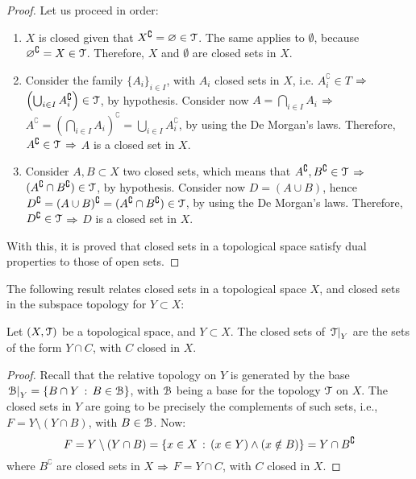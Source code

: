 \begin{proof}
	Let us proceed in order:
	\begin{enumerate}
		\item $X$ is closed given that $X^\complement=\varnothing\in \EuScript{T}$. The same applies to $\emptyset$, because $\varnothing^\complement=X\in \EuScript{T}$.
		Therefore, $X$ and $\emptyset$ are closed sets in $X$.
		\item Consider the family $\{A_i\}_{i\in I}$, with $A_i$ closed sets in $X$, i.e. $A_i^\complement\in T$ $\Rightarrow$ $\left(\bigcup_{i\in I}A_i^\complement\right)\in \EuScript{T}$, by hypothesis. Consider now $A=\bigcap_{i\in I}A_i$ $\Rightarrow$ $A^\complement = \left(\bigcap_{i\in I} A_i \right)^\complement=\bigcup_{i\in I}A_i^\complement$, by using the De Morgan's laws. Therefore, $A^\complement\in \EuScript{T}$ $\Rightarrow$ $A$ is a closed set in $X$.
		\item Consider $A,B\subset X$ two closed sets, which means that $A^\complement, B^\complement\in \EuScript{T}$ $\Rightarrow$ $(A^\complement\cap B^\complement)\in \EuScript{T}$, by hypothesis. Consider now $D=(A\cup B)$, hence $D^\complement = (A\cup B)^\complement = (A^\complement \cap B^\complement)\in \EuScript{T}$, by using the De Morgan's laws. Therefore, $D^\complement\in \EuScript{T}$ $\Rightarrow$ $D$ is a closed set in $X$.
	\end{enumerate}
	With this, it is proved that closed sets in a topological space satisfy dual properties to those of open sets.
\end{proof}

The following result relates closed sets in a topological space $X$, and closed sets in the subspace topology for $Y\subset X$:

\begin{lemma}
	\label{lem:closed-sets-subspace-topology}
	Let $(X, \EuScript{T})$ be a topological space, and $Y\subset X$. The closed sets of $\left.\EuScript{T}\right|_{Y}$ are the sets of the form $Y\cap C$, with $C$ closed in $X$.
\end{lemma}
\begin{proof}
	Recall that the relative topology on $Y$ is generated by the base $\left.\EuScript{B}\right|_{Y}=\left\{B\cap Y\,:\,B\in\EuScript{B}\right\}$, with $\EuScript{B}$ being a base for the topology $\EuScript{T}$ on $X$. The closed sets in $Y$ are going to be precisely the complements of such sets, i.e., $F=Y\setminus(Y\cap B)$, with $B\in\EuScript{B}$. Now:
	$$
	F=Y\setminus(Y\cap B)=\left\{x\in X\,:\,(x\in Y)\land(x\notin B)\right\}=Y\cap B^\complement
	$$
	where $B^\complement$ are closed sets in $X$ $\Rightarrow$ $F=Y\cap C$, with $C$ closed in $X$.
\end{proof}

